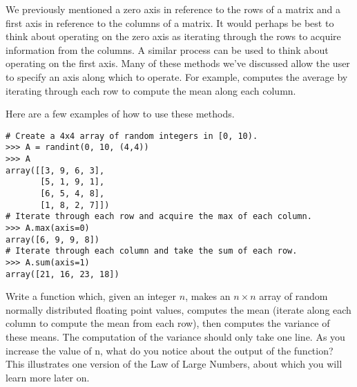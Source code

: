 We previously mentioned a zero axis in reference to the rows of a matrix
and a first axis in reference to the columns of a matrix. It would 
perhaps be best to think about operating on the zero axis as iterating
through the rows to acquire information from the columns. A similar process
can be used to think about operating on the first axis. 
Many of these methods we've discussed allow the user to specify an axis 
along which to operate. For example,  computes the average
by iterating through each row to compute the mean along each column. 

Here are a few examples of how to use these methods.
\begin{lstlisting}
# Create a 4x4 array of random integers in [0, 10). 
>>> A = randint(0, 10, (4,4)) 
>>> A
array([[3, 9, 6, 3],
       [5, 1, 9, 1],
       [6, 5, 4, 8],
       [1, 8, 2, 7]])
# Iterate through each row and acquire the max of each column.
>>> A.max(axis=0) 
array([6, 9, 9, 8])
# Iterate through each column and take the sum of each row.
>>> A.sum(axis=1)
array([21, 16, 23, 18])
\end{lstlisting}

\begin{problem}
Write a function which, given an integer $n$, makes an $n\times n$ array
of random normally distributed floating point values, computes the mean
(iterate along each column to compute the mean from each row), 
then computes the variance of these means. The
computation of the variance should only take one line. 
As you increase the value of n, what do you notice about the output of 
the function? This illustrates one version of
the Law of Large Numbers, about which you will learn more later on.
\end{problem}

